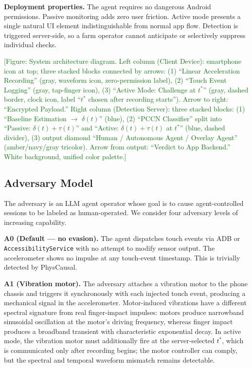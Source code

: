 \noindent\textbf{Deployment properties.}
The agent requires no dangerous Android permissions.%
Passive monitoring adds zero user friction.%
Active mode presents a single natural UI element indistinguishable from normal app flow.%
Detection is triggered server-side, so a farm operator cannot anticipate or selectively
suppress individual checks.%

\textcolor{green}{[Figure: System architecture diagram. Left column (Client Device):
smartphone icon at top; three stacked blocks connected by arrows:
(1) ``Linear Acceleration Recording'' (gray, waveform icon, zero-permission label),
(2) ``Touch Event Logging'' (gray, tap-finger icon),
(3) ``Active Mode: Challenge at $t^*$'' (gray, dashed border, clock icon, label
``$t^*$ chosen after recording starts'').
Arrow to right: ``Encrypted Payload.''
Right column (Detection Server): three stacked blocks:
(1) ``Baseline Estimation $\rightarrow$ $\delta(t)$'' (blue),
(2) ``PCCN Classifier'' split into ``Passive: $\delta(t) + \tau(t)$'' and
``Active: $\delta(t) + \tau(t)$ at $t^*$'' (blue, dashed divider),
(3) output diamond ``Human / Autonomous Agent / Overlay Agent'' (amber/navy/gray tricolor).
Arrow from output: ``Verdict to App Backend.''
White background, unified color palette.]}

\subsection{Adversary Model}
\label{sec:adversary}

The adversary is an LLM agent operator whose goal is to cause agent-controlled sessions
to be labeled as human-operated.%
We consider four adversary levels of increasing capability.%

\noindent\textbf{A0 (Default --- no evasion).}
The agent dispatches touch events via ADB or \texttt{AccessibilityService} with no
attempt to modify sensor output.%
The accelerometer shows no impulse at any touch-event timestamp.%
This is trivially detected by PhysCausal.%

\noindent\textbf{A1 (Vibration motor).}
The adversary attaches a vibration motor to the phone chassis and triggers it
synchronously with each injected touch event, producing a mechanical signal in the
accelerometer.%
Motor-induced vibrations have a different spectral signature from real finger-impact
impulses: motors produce narrowband sinusoidal oscillation at the motor's driving
frequency, whereas finger impact produces a broadband transient with characteristic
exponential decay.%
In active mode, the vibration motor must additionally fire at the server-selected $t^*$,
which is communicated only after recording begins; the motor controller can comply, but
the spectral and temporal waveform mismatch remains detectable.%

